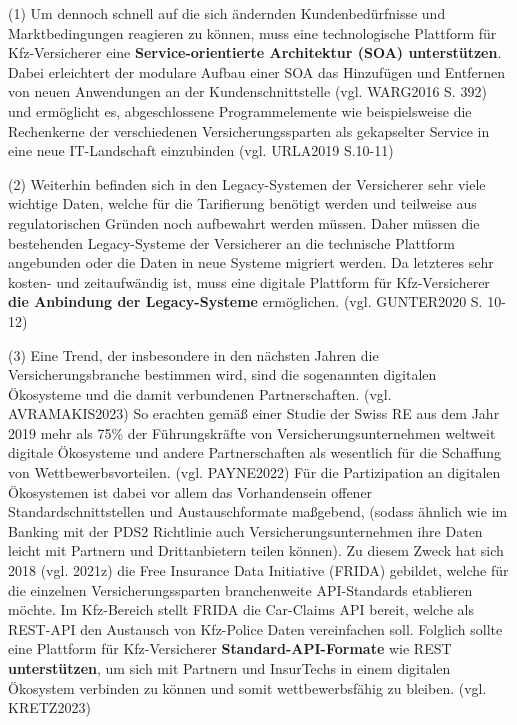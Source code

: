
(1) Um dennoch schnell auf die sich ändernden Kundenbedürfnisse und Marktbedingungen reagieren zu können, muss eine technologische Plattform für Kfz-Versicherer eine \textbf{Service-orientierte Architektur (SOA) unterstützen}. Dabei erleichtert der modulare Aufbau einer SOA das Hinzufügen und Entfernen von neuen Anwendungen an der Kundenschnittstelle (vgl. WARG2016 S. 392) und ermöglicht es, abgeschlossene Programmelemente wie beispielsweise die Rechenkerne der verschiedenen Versicherungssparten als gekapselter Service in eine neue IT-Landschaft einzubinden (vgl. URLA2019 S.10-11)

(2) Weiterhin befinden sich in den Legacy-Systemen der Versicherer sehr viele wichtige Daten, welche für die Tarifierung benötigt werden und teilweise aus regulatorischen Gründen noch aufbewahrt werden müssen. Daher müssen die bestehenden Legacy-Systeme der Versicherer an die technische Plattform angebunden oder die Daten in neue Systeme migriert werden. Da letzteres sehr kosten- und zeitaufwändig ist, muss eine digitale Plattform für Kfz-Versicherer \textbf{die Anbindung der Legacy-Systeme} ermöglichen.  (vgl. GUNTER2020 S. 10-12)

(3) Eine Trend, der insbesondere in den nächsten Jahren die Versicherungsbranche bestimmen wird, sind die sogenannten digitalen Ökosysteme und die damit verbundenen Partnerschaften. (vgl. AVRAMAKIS2023)  So erachten gemäß einer Studie der Swiss RE aus dem Jahr 2019 mehr als 75\% der Führungskräfte von Versicherungsunternehmen weltweit digitale Ökosysteme und andere Partnerschaften als wesentlich für die Schaffung von Wettbewerbsvorteilen. (vgl. PAYNE2022) Für die Partizipation an digitalen Ökosystemen ist dabei vor allem das Vorhandensein offener Standardschnittstellen und Austauschformate maßgebend, (sodass ähnlich wie im Banking mit der PDS2 Richtlinie auch Versicherungsunternehmen ihre Daten leicht mit Partnern und Drittanbietern teilen können). Zu diesem Zweck hat sich 2018 (vgl. 2021z) die Free Insurance Data Initiative (FRIDA) gebildet, welche für die einzelnen Versicherungssparten branchenweite API-Standards etablieren möchte. Im Kfz-Bereich stellt FRIDA die Car-Claims API bereit, welche als REST-API den Austausch von Kfz-Police Daten vereinfachen soll. Folglich sollte eine Plattform für Kfz-Versicherer \textbf{Standard-API-Formate} wie REST \textbf{unterstützen}, um sich mit Partnern und InsurTechs in einem digitalen Ökosystem verbinden zu können und somit wettbewerbsfähig zu bleiben. (vgl. KRETZ2023) 

